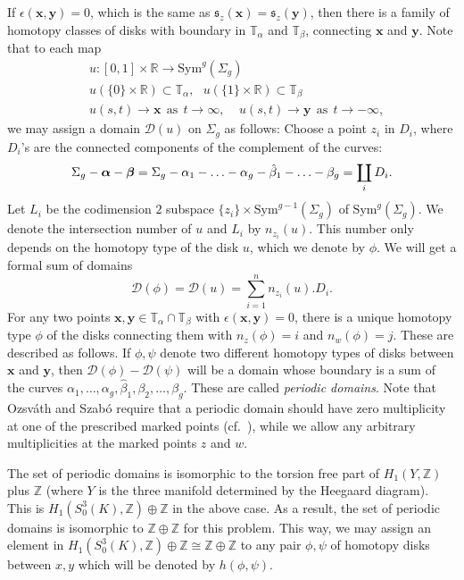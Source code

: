 \documentclass{gtart_h}
\theoremstyle{definition}
\newcommand\x{\mathbf x}
\newcommand\y{\mathbf y}
\newcommand{\spinc}{\mathfrak s}
\newcommand\alphas{\mbox{\boldmath$\alpha$}}
\newcommand\betas{\mbox{\boldmath$\beta$}}
\newcommand\Sym{\mathrm{Sym}}
\begin{document}
If $\epsilon(\x,\y)=0$, which is the same as $\spinc_z(\x)=\spinc_z(\y)$, then there is a family of
homotopy classes of disks with boundary in $\mathbb{T}_\alpha$ and $ \mathbb{T}_\beta$,
connecting  $\x$ and $\y$. Note that to each map
\begin{displaymath}
\begin{split}
&u: [0,1]\times \mathbb{R} \rightarrow \Sym^g(\Sigma_g)\\
&u(\{0\} \times \mathbb{R}) \subset \mathbb{T}_\alpha, \ \ \
u(\{1\} \times \mathbb{R}) \subset \mathbb{T}_\beta\\
&u(s,t) \rightarrow \x \ \  \text{as} \ \ t\rightarrow \infty, \ \ \ \ \
u(s,t) \rightarrow \y \ \  \text{as} \ \ t\rightarrow -\infty,
\end{split}
\end{displaymath}
we may assign a domain $\mathcal{D}(u)$ on $\Sigma_g$ as follows: Choose a point $z_i$ in
$D_i$, where $D_i$'s are the connected components of the complement of the curves:
$$\Sigma_g-\alphas-\betas=\Sigma_g-\alpha_1-\ldots-\alpha_g-\hat \beta_1-\ldots-\beta_g=\coprod_i D_i. $$
Let $L_i$ be the codimension $2$ subspace $\{z_i\}\times \Sym^{g-1}(\Sigma_g)$ of
$\Sym^g(\Sigma_g)$. We denote the intersection number of $u$ and $L_i$ by $n_{z_i}(u)$.
This number only depends on the homotopy type of the disk $u$, which we denote
by $\phi$. We will get a formal sum of domains
$$
\mathcal{D}(\phi)=\mathcal{D}(u)=\sum_{i=1}^{n} n_{z_i}(u).D_i.$$
For any two points $\x,\y\in \mathbb{T}_\alpha \cap \mathbb{T}_\beta$ with $\epsilon(\x,\y)=0$,
there is a unique homotopy type $\phi$ of the disks connecting
them with $n_z(\phi)=i$ and $n_w(\phi)=j$.
These are described
as follows. If $\phi, \psi$ denote two different homotopy types of disks between
$\x$ and $\y$, then $\mathcal{D}(\phi) -\mathcal{D}(\psi)$ will be a domain whose boundary is
a sum of the curves $\alpha_1,\ldots,\alpha_g,\hat \beta_1,\beta_2,\ldots,\beta_g$.
These are called \emph{periodic domains}. Note that Ozsv\'ath and
Szab\'o require that a periodic domain should have zero multiplicity
at one of the prescribed marked points (cf.\ \cite{OS-3m1}), while we allow
any arbitrary multiplicities at the marked points $z$ and $w$. 

The set of periodic domains is isomorphic to the torsion free part of
$H_1(Y,\mathbb{Z})$ plus $\mathbb{Z}$
(where $Y$ is the three manifold determined by the Heegaard
diagram). This is $H_1(S^3_0(K),\mathbb{Z})\oplus \mathbb{Z}$
in the above case. As a result, the set of periodic domains
is isomorphic to $\mathbb{Z}\oplus \mathbb{Z}$ for this problem. This way, we may
assign an element in
$H_1(S^3_0(K),\mathbb{Z})\oplus \mathbb{Z}\cong \mathbb{Z}\oplus \mathbb{Z}$ to any pair $\phi,\psi$ of homotopy
disks between $x,y$ which will be denoted by $h(\phi,\psi)$.
\end{document}
